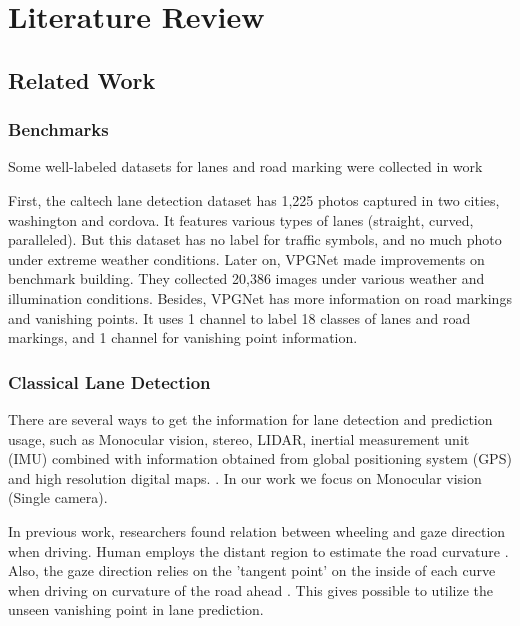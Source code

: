 
\chapter{Literature Review}
\begin{spacing}{1.5}
\setlength{\parskip}{0.3in}

\section{Related Work}

\subsection{Benchmarks}

Some well-labeled datasets for lanes and road marking were collected in work \cite{caltech, lee2017vpgnet}

First, the caltech lane detection dataset \cite{caltech} has 1,225 photos captured in two cities, washington and cordova. It features various types of lanes (straight, curved, paralleled). But this dataset has no label for traffic symbols, and no much photo under extreme weather conditions. Later on, VPGNet \cite{lee2017vpgnet} made improvements on benchmark building. They collected 20,386 images under various weather and illumination conditions. Besides, VPGNet has more information on road markings and vanishing points. It uses 1 channel to label 18 classes of lanes and road markings, and 1 channel for vanishing point information.

\subsection{Classical Lane Detection}

There are several ways to get the information for lane detection and prediction usage, such as Monocular vision, stereo, LIDAR, inertial measurement unit (IMU) combined with information obtained from global positioning system (GPS) and high resolution digital maps. \cite{hillel2014recent}. In our work we focus on Monocular vision (Single camera).

In previous work, researchers found relation between wheeling and gaze direction when driving. Human employs the distant region to estimate the road curvature \cite{land1995parts}. Also, the gaze direction relies on the 'tangent point' on the inside of each curve when driving on curvature of the road ahead \cite{land1994we}. This gives possible to utilize the unseen vanishing point in lane prediction.


\end{spacing}
